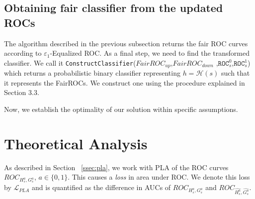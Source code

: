 \documentclass{article}
\newcommand{\sg}[1]{ \textcolor{brown}{{\bf SG: }{``\em #1''}}}
\newcommand{\ourdef}{-Equalized ROC}
\newcommand{\roc}{\texttt{ROC}_s}
\begin{document}
\subsection{Obtaining fair classifier from the updated ROCs} \label{ssec:randomclass}

The algorithm described in the previous subsection returns the fair ROC curves according to $\varepsilon_1$\ourdef. As a final step, we 
need to find the transformed classifier.  We call it \texttt{ConstructClassifier}($FairROC_{up}$,$FairROC_{down}$
,$\roc^0$,$\roc^1$) which returns a probabilistic binary classifier representing $h = \mathcal{H}(s)$ such that it represents the FairROCs. We construct one using the procedure explained in Section 3.3.

Now, we establish the optimality of our solution within specific assumptions.
\section{Theoretical Analysis}
As described in Section ~\eqref{ssec:pla}, we work with PLA of the ROC curves $ROC_{H_s^a, G_s^a}$, $a\in \{0,1\}$. This causes a \emph{loss} in area under ROC. We denote this loss by $\mathcal{L}_{PLA}$ and is quantified as the difference in AUCs of $ROC_{H_s^a, G_s^a}$ and $ROC_{\widehat{H_s^a}, \widehat{G_s^a}}$.
\end{document}
